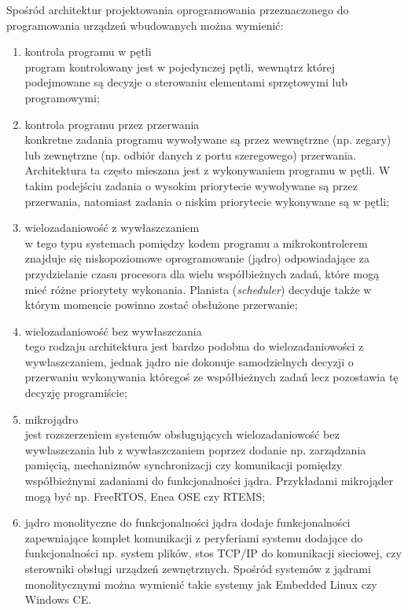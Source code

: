 Spośród architektur projektowania oprogramowania przeznaczonego do programowania urządzeń wbudowanych można wymienić:
\begin{enumerate}
\item kontrola programu w pętli \\
program kontrolowany jest w pojedynczej pętli, wewnątrz której podejmowane są decyzje o sterowaniu elementami sprzętowymi lub programowymi;
\item kontrola programu przez przerwania \\
konkretne zadania programu wywoływane są przez wewnętrzne (np. zegary) lub zewnętrzne (np. odbiór danych z portu szeregowego) przerwania.
Architektura ta często mieszana jest z wykonywaniem programu w pętli. W takim podejściu zadania o wysokim priorytecie wywoływane są przez przerwania, natomiast zadania o niskim priorytecie wykonywane są w pętli;
\item wielozadaniowość z wywłaszczaniem \\
w tego typu systemach pomiędzy kodem programu a mikrokontrolerem znajduje się niskopoziomowe oprogramowanie (jądro) odpowiadające za przydzielanie czasu procesora dla wielu współbieżnych zadań, które mogą mieć różne priorytety wykonania. Planista (\emph{scheduler}) decyduje także w którym momencie powinno zostać obsłużone przerwanie;
\item wielozadaniowość bez wywłaszczania \\
tego rodzaju architektura jest bardzo podobna do wielozadaniowości z wywłaszczaniem, jednak jądro nie dokonuje samodzielnych decyzji o przerwaniu wykonywania któregoś ze współbieżnych zadań lecz pozostawia tę decyzję programiście;
\item mikrojądro \\
jest rozszerzeniem systemów obsługujących wielozadaniowość bez wywłaszczania lub z wywłaszczaniem poprzez dodanie np. zarządzania pamięcią, mechanizmów synchronizacji czy komunikacji pomiędzy współbieżnymi zadaniami do funkcjonalności jądra. Przykładami mikrojąder mogą być np. FreeRTOS, Enea OSE czy RTEMS;
\item jądro monolityczne
do funkcjonalności jądra dodaje funkcjonalności zapewniające komplet komunikacji z peryferiami systemu dodające do funkcjonalności np. system plików, stos TCP/IP do komunikacji sieciowej, czy sterowniki obsługi urządzeń zewnętrznych.
Spośród systemów z jądrami monolitycznymi można wymienić takie systemy jak Embedded Linux czy Windows CE.
\end{enumerate}

